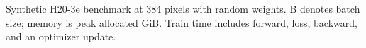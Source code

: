 \begin{table}[htbp]
\caption{Synthetic H20-3e benchmark at 384 pixels with random weights.
B denotes batch size; memory is peak allocated GiB. Train time includes
forward, loss, backward, and an optimizer update.}
\label{tab:highres-efficiency}
\centering\small

\end{table}
